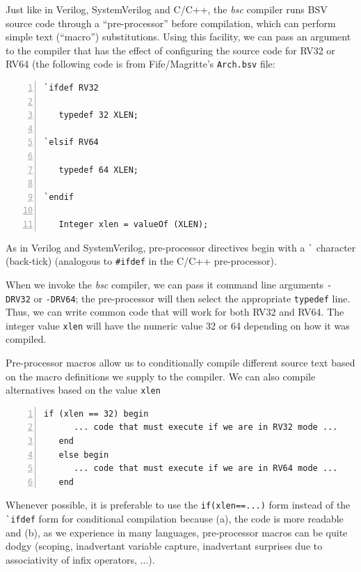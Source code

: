 
Just like in Verilog, SystemVerilog and C/C++, the \emph{bsc} compiler
runs BSV source code through a ``pre-processor'' before compilation,
which can perform simple text (``macro'') substitutions.  Using this
facility, we can pass an argument to the compiler that has the effect
of configuring the source code for RV32 or RV64 (the following code is
from Fife/Magritte's \verb|Arch.bsv| file:

\begin{Verbatim}[frame=single, numbers=left]
`ifdef RV32

   typedef 32 XLEN;

`elsif RV64

   typedef 64 XLEN;

`endif

   Integer xlen = valueOf (XLEN);
\end{Verbatim}

As in Verilog and SystemVerilog, pre-processor directives begin with a
\verb|`| character (back-tick) (analogous to \verb|#ifdef| in the
C/C++ pre-processor).

When we invoke the \emph{bsc} compiler, we can pass it command line
arguments \verb|-DRV32| or \verb|-DRV64|; the pre-processor will then
select the appropriate \verb|typedef| line.  Thus, we can write common
code that will work for both RV32 and RV64.  The integer value
\verb|xlen| will have the numeric value 32 or 64 depending on how it
was compiled.

Pre-processor macros allow us to conditionally compile different
source text based on the macro definitions we supply to the compiler.
We can also compile alternatives based on the value \verb|xlen|

\begin{Verbatim}[frame=single, numbers=left]
   if (xlen == 32) begin
      ... code that must execute if we are in RV32 mode ...
   end
   else begin
      ... code that must execute if we are in RV64 mode ...
   end
\end{Verbatim}

Whenever possible, it is preferable to use the \verb|if(xlen==...)|
form instead of the \verb|`ifdef| form for conditional compilation
because (a), the code is more readable and (b), as we experience in
many languages, pre-processor macros can be quite dodgy (scoping,
inadvertant variable capture, inadvertant surprises due to
associativity of infix operators, ...).

